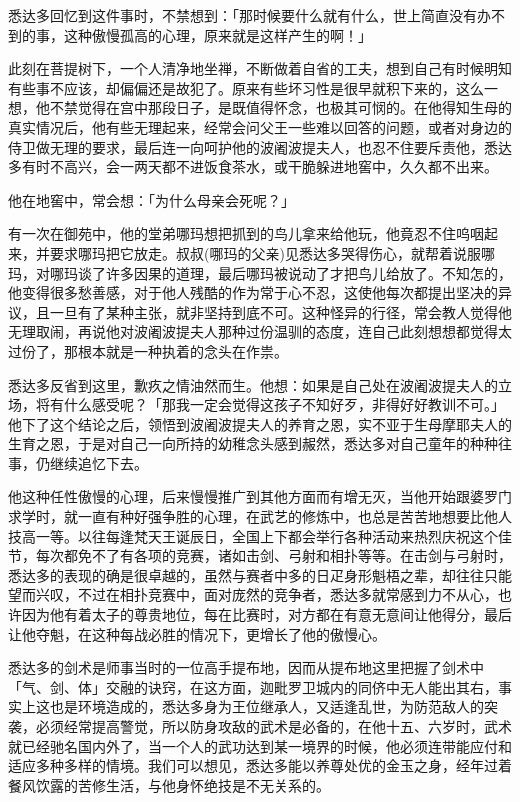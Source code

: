 \documentclass[twoside,openany]{book}
\begin{document}
悉达多回忆到这件事时，不禁想到：「那时候要什么就有什么，世上简直没有办不到的事，这种傲慢孤高的心理，原来就是这样产生的啊！」

此刻在菩提树下，一个人清净地坐禅，不断做着自省的工夫，想到自己有时候明知有些事不应该，却偏偏还是故犯了。原来有些坏习性是很早就积下来的，这么一想，他不禁觉得在宫中那段日子，是既值得怀念，也极其可悯的。在他得知生母的真实情况后，他有些无理起来，经常会问父王一些难以回答的问题，或者对身边的侍卫做无理的要求，最后连一向呵护他的波阇波提夫人，也忍不住要斥责他，悉达多有时不高兴，会一两天都不进饭食茶水，或干脆躲进地窖中，久久都不出来。

他在地窖中，常会想：「为什么母亲会死呢？」

有一次在御苑中，他的堂弟哪玛想把抓到的鸟儿拿来给他玩，他竟忍不住呜咽起来，并要求哪玛把它放走。叔叔(哪玛的父亲)见悉达多哭得伤心，就帮着说服哪玛，对哪玛谈了许多因果的道理，最后哪玛被说动了才把鸟儿给放了。不知怎的，他变得很多愁善感，对于他人残酷的作为常于心不忍，这使他每次都提出坚决的异议，且一旦有了某种主张，就非坚持到底不可。这种怪异的行径，常会教人觉得他无理取闹，再说他对波阇波提夫人那种过份温驯的态度，连自己此刻想想都觉得太过份了，那根本就是一种执着的念头在作祟。

悉达多反省到这里，歉疚之情油然而生。他想：如果是自己处在波阇波提夫人的立场，将有什么感受呢？「那我一定会觉得这孩子不知好歹，非得好好教训不可。」他下了这个结论之后，领悟到波阇波提夫人的养育之恩，实不亚于生母摩耶夫人的生育之恩，于是对自己一向所持的幼稚念头感到赧然，悉达多对自己童年的种种往事，仍继续追忆下去。

他这种任性傲慢的心理，后来慢慢推广到其他方面而有增无灭，当他开始跟婆罗门求学时，就一直有种好强争胜的心理，在武艺的修炼中，也总是苦苦地想要比他人技高一等。以往每逢梵天王诞辰日，全国上下都会举行各种活动来热烈庆祝这个佳节，每次都免不了有各项的竞赛，诸如击剑、弓射和相扑等等。在击剑与弓射时，悉达多的表现的确是很卓越的，虽然与赛者中多的日疋身形魁梧之辈，却往往只能望而兴叹，不过在相扑竞赛中，面对庞然的竞争者，悉达多就常感到力不从心，也许因为他有着太子的尊贵地位，每在比赛时，对方都在有意无意间让他得分，最后让他夺魁，在这种每战必胜的情况下，更增长了他的傲慢心。

悉达多的剑术是师事当时的一位高手提布地，因而从提布地这里把握了剑术中「气、剑、体」交融的诀窍，在这方面，迦毗罗卫城内的同侪中无人能出其右，事实上这也是环境造成的，悉达多身为王位继承人，又适逢乱世，为防范敌人的突袭，必须经常提高警觉，所以防身攻敌的武术是必备的，在他十五、六岁时，武术就已经驰名国内外了，当一个人的武功达到某一境界的时候，他必须连带能应付和适应多种多样的情境。我们可以想见，悉达多能以养尊处优的金玉之身，经年过着餐风饮露的苦修生活，与他身怀绝技是不无关系的。
\end{document}
